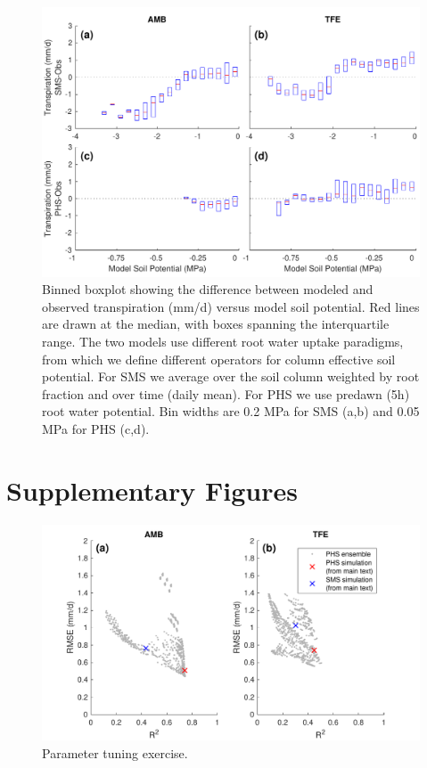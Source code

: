 \documentclass[draft,linenumbers]{agujournal}
\begin{document}
              \begin{figure}[h]
     \centering
     \includegraphics[width=30pc]{../figs3/sm3.pdf}
     \caption{Binned boxplot showing the difference between modeled and observed transpiration (mm/d) versus model soil potential.
     Red lines are drawn at the median, with boxes spanning the interquartile range.
     The two models use different root water uptake paradigms, from which we define different operators for column effective soil potential.
     For SMS we average over the soil column weighted by root fraction and over time (daily mean).
     For PHS we use predawn (5h) root water potential.
     Bin widths are 0.2 MPa for SMS (a,b) and 0.05 MPa for PHS (c,d).
}
     \label{fig:cool}
  \end{figure}
          \clearpage

\clearpage

\appendix

\section{Supplementary Figures}


      \begin{figure}[h]
     \centering
     \includegraphics[width=30pc]{../figs3/ens.pdf}
     \caption{Parameter tuning exercise.
     }
     \label{supp:ens}
       \end{figure}
         \clearpage
\end{document}
